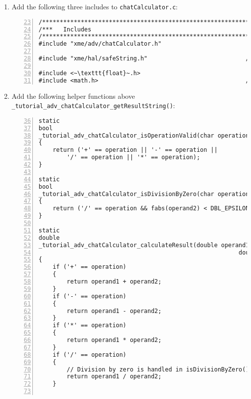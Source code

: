 \begin{enumerate}
\begin{lstlisting}[numbers=left,firstnumber=31]
	pos = strchr(pos+1, 0x20);
	if (NULL == pos)
	{
		strcpy_s(out, outSize, error_syntax);
		return;
	}
	operand2 = atof(pos+1);

	// Check for operator and division by zero
	if (!_tutorial_adv_chatCalculator_isOperationValid(op))
	{
		strcpy_s(out, outSize, error_op);
		return;
	}
	if (_tutorial_adv_chatCalculator_isDivisionByZero(op, operand2))
	{
		strcpy_s(out, outSize, error_zero);
		return;
	}

	// Calculate result
	result =
		_tutorial_adv_chatCalculator_calculateResult(operand1, op, operand2);

	// Output result
	xme_hal_safeString_snprintf
	(
		out, outSize, "%lf %c %lf = %lf",
		operand1, op, operand2, result
	);
}
\end{lstlisting}

	\item Add the following three includes to \verb|chatCalculator.c|:
	
\begin{lstlisting}[numbers=left,firstnumber=23]
/*************************************************************************/
/***   Includes                                                        ***/
/*************************************************************************/
#include "xme/adv/chatCalculator.h"

#include "xme/hal/safeString.h"                            /~~/ Add this line

#include <~\texttt{float}~.h>                                          /~~/ Add this line
#include <math.h>                                          /~~/ Add this line
\end{lstlisting}

	\item Add the following helper functions above \verb|_tutorial_adv_chatCalculator_getResultString()|:

\begin{lstlisting}[numbers=left,firstnumber=36]
static
bool
_tutorial_adv_chatCalculator_isOperationValid(char operation)
{
	return ('+' == operation || '-' == operation ||
		'/' == operation || '*' == operation);
}

static
bool
_tutorial_adv_chatCalculator_isDivisionByZero(char operation, double operand2)
{
	return ('/' == operation && fabs(operand2) < DBL_EPSILON);
}

static
double
_tutorial_adv_chatCalculator_calculateResult(double operand1, char operation,
                                                         double operand2)
{
	if ('+' == operation)
	{
		return operand1 + operand2;
	}
	if ('-' == operation)
	{
		return operand1 - operand2;
	}
	if ('*' == operation)
	{
		return operand1 * operand2;
	}
	if ('/' == operation)
	{
		// Division by zero is handled in isDivisionByZero()
		return operand1 / operand2;
	}


\end{lstlisting}
\end{enumerate}

